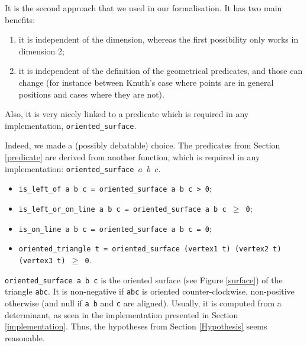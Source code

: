 \documentclass[a4paper,10pt]{article}
\def\ttt#1#2{{\tt{\color{black}#1} #2}}
\begin{document}
It is the second approach that we used in our formalisation. It has two main benefits:
\begin{enumerate}
\item it is independent of the dimension, whereas the first possibility only works in dimension 2;
\item it is independent of the definition of the geometrical predicates, and those can change (for instance between Knuth's case where points are in general positions and cases where they are not). 
\end{enumerate}




Also, it is very nicely linked to a predicate which is required in any implementation, {\tt oriented\_surface}.


Indeed, we made a (possibly debatable) choice. The predicates from Section \ref{predicate} are derived from another function, which is required in any implementation: \ttt{oriented\_surface}{$a$ $b$ $c$}.
\begin{itemize}
\item \ttt{is\_left\_of}{a b c = oriented\_surface a b c > 0};
  \item \ttt{is\_left\_or\_on\_line}{a b c = oriented\_surface a b c $\geq$ 0};
  \item \ttt{is\_on\_line}{a b c = oriented\_surface a b c = 0};
 \item \ttt{oriented\_triangle}{t = oriented\_surface (vertex1 t) (vertex2 t) (vertex3 t) $\geq$ 0}.
 \end{itemize}

{\tt oriented\_surface a b c} is the oriented surface (see Figure \ref{surface}) of the triangle {\tt abc}. It is non-negative if {\tt abc} is oriented counter-clockwise, non-positive otherwise (and null if {\tt a b} and {\tt c} are aligned).
Usually, it is computed from a determinant, as seen in the implementation presented in Section \ref{implementation}. Thus, the hypotheses from Section \ref{Hypothesis} seems reasonable.
\end{document}
